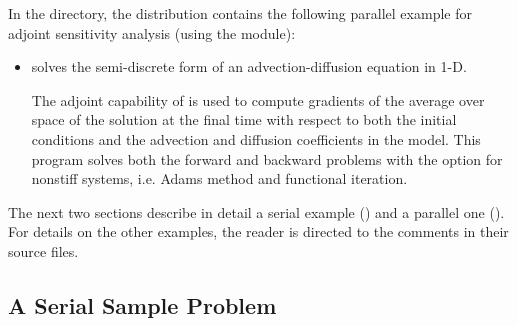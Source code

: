 \noindent In the  directory, the {\cvodes} distribution 
contains the following parallel example for adjoint sensitivity analysis
(using the {\nvecp} module):
\begin{itemize}
\item {}
  solves the semi-discrete form of an advection-diffusion equation in 1-D.

  The adjoint capability of {\cvodes} is used to compute gradients
  of the average over space of the solution at the final time with
  respect to both the initial conditions and the advection and
  diffusion coefficients in the model.
  This program solves both the forward and backward problems with the option 
  for nonstiff systems, i.e. Adams method and functional iteration.
\end{itemize}

The next two sections describe in detail a serial example () and
a parallel one (). For details on the other examples, the reader is
directed to the comments in their source files.

\subsection{A Serial Sample Problem}\label{ss:serial_adj_ex}

